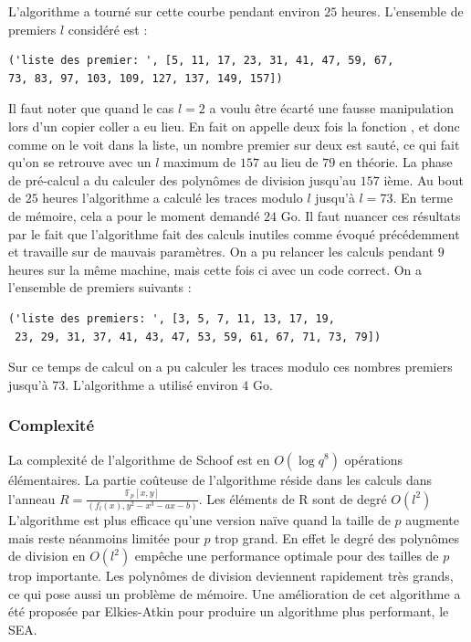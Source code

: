 \documentclass[12pt]{article}
\begin{document}
\newline
L'algorithme a tourné sur cette courbe pendant environ $25$ heures. L'ensemble de premiers $l$ considéré est : 
\medskip
\begin{lstlisting}
('liste des premier: ', [5, 11, 17, 23, 31, 41, 47, 59, 67, 
73, 83, 97, 103, 109, 127, 137, 149, 157])
\end{lstlisting}
\medskip
Il faut noter que quand le cas $l=2$ a voulu être écarté une fausse manipulation lors d'un copier coller a eu lieu. En fait on appelle deux fois la fonction , et donc comme on le voit dans la liste, un nombre premier sur deux est sauté, ce qui fait qu'on se retrouve avec un $l$ maximum de $157$ au lieu de $79$ en théorie. La phase de pré-calcul a du calculer des polynômes de division jusqu'au $157$ ième. Au bout de $25$ heures l'algorithme a calculé les traces modulo $l$ jusqu’à $l=73$. En terme de mémoire, cela a pour le moment demandé $24$ Go. Il faut nuancer ces résultats par le fait que l'algorithme fait des calculs inutiles comme évoqué précédemment et travaille sur de mauvais paramètres. 
\newline
On a pu relancer les calculs pendant $9$ heures sur la même machine, mais cette fois ci avec un code correct. On a l'ensemble de premiers suivants :
\medskip 
\begin{lstlisting}
('liste des premiers: ', [3, 5, 7, 11, 13, 17, 19,
 23, 29, 31, 37, 41, 43, 47, 53, 59, 61, 67, 71, 73, 79])
\end{lstlisting}
\medskip
Sur ce temps de calcul on a pu calculer les traces modulo ces nombres premiers jusqu’à $73$. L'algorithme a utilisé environ $4$ Go.
\subsubsection{Complexité}
La complexité de l'algorithme de Schoof est en $O(\log{q}^8)$ opérations élémentaires. La partie coûteuse de l'algorithme réside dans les calculs dans l'anneau $R = \frac{\mathbb{F}_p[x,y]}{(f_l(x), y^2 -x^3 -ax -b)}$. Les éléments de R sont de degré $O(l^2)$ 
\newline
 L'algorithme est plus efficace qu'une version naïve quand la taille de $p$ augmente mais reste néanmoins limitée pour $p$ trop grand. En effet le degré des polynômes de division en $O(l^2)$ empêche une performance optimale pour des tailles de $p$ trop importante. Les polynômes de division deviennent rapidement très grands, ce qui pose aussi un problème de mémoire. Une amélioration de cet algorithme a été proposée par Elkies-Atkin pour produire un algorithme plus performant, le SEA. 
 
\end{document}
